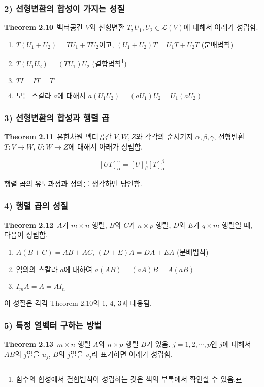 \subsubsection*{2) 선형변환의 합성이 가지는 성질}
\textbf{Theorem 2.10}\, 벡터공간 $V$와 선형변환 $T,U_1,U_2 \in \mathcal{L}(V)$에 대해서 아래가 성립함.

\begin{enumerate}
    \item $T(U_1+U_2)=TU_1+TU_2$이고, $(U_1+U_2)T=U_1T+U_2T$ (분배법칙)
    \item $T(U_1U_2)=(TU_1)U_2$ (결합법칙\footnote{함수의 합성에서 결합법칙이 성립하는 것은 책의 부록에서 확인할 수 있음.})
    \item $TI=IT=T$
    \item 모든 스칼라 $a$에 대해서 $a(U_1U_2)=(aU_1)U_2=U_1(aU_2)$
\end{enumerate}

\subsubsection*{3) 선형변환의 합성과 행렬 곱}
\textbf{Theorem 2.11}\, 유한차원 벡터공간 $V,W,Z$와 각각의 순서기저 $\alpha,\beta,\gamma$, 선형변환 $T:V \rightarrow W$, $U:W \rightarrow Z$에 대해서 아래가 성립함.

\[
[UT]_{\alpha}^{\gamma}=[U]_{\beta}^{\gamma}[T]_{\alpha}^{\beta}
\]

행렬 곱의 유도과정과 정의를 생각하면 당연함.

\subsubsection*{4) 행렬 곱의 성질}
\textbf{Theorem 2.12}\, $A$가 $m \times n$ 행렬, $B$와 $C$가 $n \times p$ 행렬, $D$와 $E$가 $q \times m$ 행렬일 때, 다음이 성립함.

\begin{enumerate}
    \item $A(B+C)=AB+AC,\,(D+E)A=DA+EA$ (분배법칙)
    \item 임의의 스칼라 $a$에 대하여 $a(AB)=(aA)B=A(aB)$
    \item $I_{m}A=A=AI_{n}$
\end{enumerate}

이 성질은 각각 Theorem 2.10의 1, 4, 3과 대응됨.

\subsubsection*{5) 특정 열벡터 구하는 방법}
\textbf{Theorem 2.13}\, $m \times n$ 행렬 $A$와 $n \times p$ 행렬 $B$가 있음. $j=1,2, \cdots ,p$인 $j$에 대해서 $AB$의 $j$열을 $u_j$, $B$의 $j$열을 $v_j$라 표기하면 아래가 성립함.

